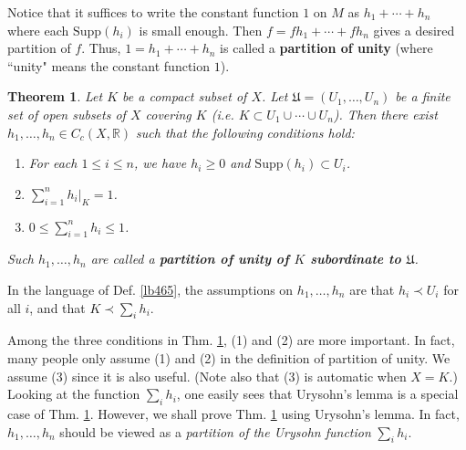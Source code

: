 \documentclass[12pt,b5paper,notitlepage]{article}
\theoremstyle{definition}
\theoremstyle{plain}
\newtheorem{thm}[df]{Theorem}
\newcommand{\fk}{\mathfrak}
\newcommand{\Rbb}{\mathbb R}
\newcommand{\Supp}{\mathrm{Supp}}
\newcommand{\dps}{\displaystyle}
\numberwithin{equation}{section}
\begin{document}
Notice that it suffices to write the constant function $1$ on $M$ as $h_1+\cdots+h_n$ where each $\Supp(h_i)$ is small enough. Then $f=fh_1+\cdots+fh_n$ gives a desired partition of $f$. Thus, $1=h_1+\cdots+h_n$ is called a \textbf{partition of unity} (where ``unity" means the constant function $1$).



\begin{thm}\label{lb466}
Let $K$ be a compact subset of $X$. Let $\fk U=(U_1,\dots,U_n)$ be a finite set of open subsets of $X$ covering $K$ (i.e. $K\subset U_1\cup\cdots\cup U_n$). Then there exist $h_1,\dots,h_n\in C_c(X,\Rbb)$ such that the following conditions hold:
\begin{enumerate}[label=(\arabic*)]
\item For each $1\leq i\leq n$, we have $h_i\geq 0$ and $\Supp (h_i)\subset U_i$.
\item  $\dps\sum_{i=1}^nh_i\big|_K=1$.
\item $\dps 0\leq\sum_{i=1}^nh_i\leq 1$. 
\end{enumerate}
Such $h_1,\dots,h_n$ are called a \textbf{partition of unity of $K$ subordinate to $\fk U$}. 
\end{thm}

In the language of Def. \ref{lb465}, the assumptions on $h_1,\dots,h_n$ are that $h_i\prec U_i$ for all $i$, and that $K\prec\sum_i h_i$. 

Among the three conditions in Thm. \ref{lb466}, (1) and (2) are more important. In fact, many people only assume (1) and (2) in the definition of partition of unity. We assume (3) since it is also useful. (Note also that (3) is automatic when $X=K$.) Looking at the function $\sum_i h_i$, one easily sees that Urysohn's lemma is a special case of Thm. \ref{lb466}. However, we shall prove Thm. \ref{lb466} using Urysohn's lemma. In fact, $h_1,\dots,h_n$ should be viewed as a \textit{partition of the Urysohn function} $\sum_i h_i$.
\end{document}
